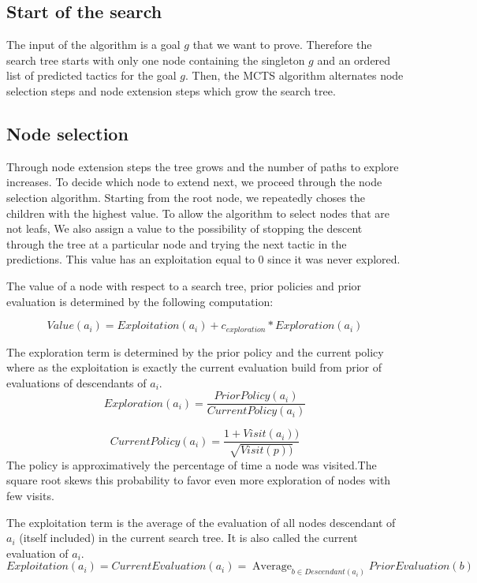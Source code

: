 \documentclass[runningheads,a4paper,draft]{svjour3}
\DeclareMathOperator*{\average}{Average}
\begin{document}
\subsection{Start of the search}
The input of the algorithm is a goal $g$ that we want to prove.
Therefore the search tree starts with only one node containing the singleton 
$g$ and an ordered list of predicted tactics for the goal $g$.
Then, the MCTS algorithm alternates node selection steps and node extension 
steps which grow the search tree.

\subsection{Node selection}


Through node extension steps the tree grows and  the number of paths to explore 
increases. To decide which node to extend next, we proceed through the node 
selection algorithm. Starting from the root node, we repeatedly choses the 
children with the highest value. To allow the algorithm to select nodes that 
are not leafs, We also assign a value to the possibility of stopping the 
descent through the tree at a particular node and trying the next tactic in the 
predictions. This value has an exploitation equal to 0 since it was never 
explored. 


The value of a node with respect to a search tree, prior policies and prior 
evaluation is determined by the 
following computation:

\[Value(a_i) = Exploitation(a_i) + c_{exploration} * Exploration(a_i)\] 

The exploration term is determined by the prior policy and the current policy 
where as the exploitation is exactly the current evaluation build from prior of 
evaluations of descendants of $a_i$.
\[Exploration(a_i) = \frac{PriorPolicy(a_i)}{CurrentPolicy(a_i)}\]

\[CurrentPolicy(a_i) = \frac{1 + Visit(a_i))}{\sqrt{Visit(p))}}\]
The policy is approximatively the  percentage of time a node was visited.The 
square root skews this probability to favor even more exploration of nodes with 
few visits. 

The exploitation term is the average of the evaluation of 
all nodes descendant of $a_i$ (itself included) in the current search tree. It 
is also called the current evaluation of $a_i$.   
\[Exploitation(a_i) = CurrentEvaluation(a_i) = 
  \average_{b \in Descendant(a_i)} {PriorEvaluation(b)}\]
\end{document}
